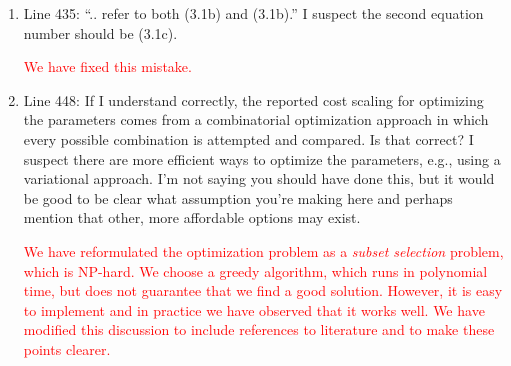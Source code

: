 \documentclass{article}
\newcommand{\response}[1]{\textcolor{red}{#1}}
\begin{document}
\begin{enumerate}
    \response{
    We have updated the paragraph to highlight that previous work has avoided computing the eigenvalues of $M(x)$ due to its relatively high computational cost. We then state that our work differs from this previous work because we choose to accept this cost with the goal of obtaining a net decrease in computational cost by choosing parameters that converge faster. For large problems, computing the full eigenspectrum will not be feasible, but it is feasible for the problems considered in this work and much of the previous work on OWNS. Future work should investigate how to modify the greedy algorithm to work with only a subset of the full eigenspectrum so that the method can be applied to large systems.
    }
    
    \item Line 435: ``.. refer to both (3.1b) and (3.1b).'' I suspect the second equation number should be (3.1c).

    \response{We have fixed this mistake.}
    
    \item Line 448: If I understand correctly, the reported cost scaling for optimizing the parameters comes from a combinatorial optimization approach in which every possible combination is attempted and compared. Is that correct? I suspect there are more efficient ways to optimize the parameters, e.g., using a variational approach. I'm not saying you should have done this, but it would be good to be clear what assumption you're making here and perhaps mention that other, more affordable options may exist.

    \response{We have reformulated the optimization problem as a \textit{subset selection} problem, which is NP-hard. We choose a greedy algorithm, which runs in polynomial time, but does not guarantee that we find a good solution. However, it is easy to implement and in practice we have observed that it works well. We have modified this discussion to include references to literature and to make these points clearer.
    }

    

\end{enumerate}
\end{document}
